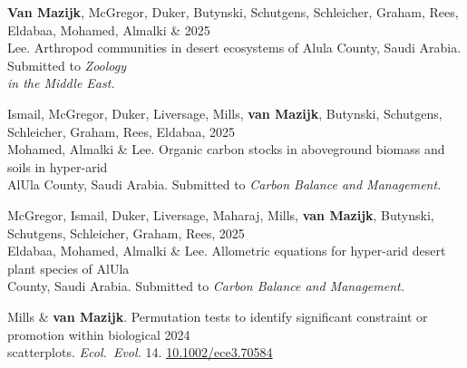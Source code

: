

\textbf{Van Mazijk}, McGregor, Duker, Butynski, Schutgens, Schleicher, Graham, Rees, Eldabaa, Mohamed, Almalki \& \hfill 2025 \\
\hspace{2em} Lee.
  Arthropod communities in desert ecosystems of Alula County, Saudi Arabia. Submitted to \textit{Zoology} \\
  \hspace{2em} \textit{in the Middle East.}

Ismail, McGregor, Duker, Liversage, Mills, \textbf{van Mazijk}, Butynski, Schutgens, Schleicher, Graham, Rees, Eldabaa, \hfill 2025 \\
\hspace{2em} Mohamed, Almalki \& Lee.
  Organic carbon stocks in aboveground biomass and soils in hyper-arid \\
  \hspace{2em} AlUla County, Saudi Arabia.
  Submitted to \textit{Carbon Balance and Management.}

McGregor, Ismail, Duker, Liversage, Maharaj, Mills, \textbf{van Mazijk}, Butynski, Schutgens, Schleicher, Graham, Rees, \hfill 2025 \\
\hspace{2em} Eldabaa, Mohamed, Almalki \& Lee.
  Allometric equations for hyper-arid desert plant species of AlUla \\
  \hspace{2em} County, Saudi Arabia.
  Submitted to \textit{Carbon Balance and Management.}

Mills \& \textbf{van Mazijk}.
Permutation tests to identify significant constraint or promotion within biological \hfill 2024 \\
\hspace{2em} scatterplots.
  \textit{Ecol.~Evol.}
  14. \href{http://dx.doi.org/10.1002/ece3.70584}{10.1002/ece3.70584}

